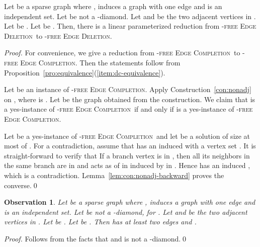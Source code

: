 \documentclass[envcountsame,envcountsect,10pt,oribibl]{llncs}
\newcommand{\pname}[1]{\textnormal{\textsc{#1}}}
\newcommand{\HED}{\pname{-free Edge Deletion}}
\newcommand{\HDED}{\pname{-free Edge Deletion}}
\newcommand{\HBEC}{\pname{-free Edge Completion}}
\newcommand{\HDBEC}{\pname{-free Edge Completion}}
\newtheorem{observation}[lemma]{Observation}
\begin{document}
\begin{lemma}
  \label{lem:vh1vl0}
  Let  be a sparse  graph where , 
  induces a graph with one edge and  is an independent set.
  Let  be not a -diamond.
  Let  and  be the two adjacent vertices in .
  Let  be . Let  be . 
  Then, there is a linear
  parameterized reduction from \HDED\ to \HED.
\end{lemma}
\begin{proof}
  For convenience, we give a reduction from \HDBEC\ to \HBEC. Then the statements follow 
  from Proposition~\ref{pro:equivalence}(\ref{item:dc-equivalence}).

  Let  be an instance of \HDBEC. Apply Construction~\ref{con:nonadj}
  on , where  is .
  Let  be the graph obtained from the construction. We claim that 
   is a yes-instance of \HDBEC\ if and only if  is a 
  yes-instance of \HBEC.

  Let  be a yes-instance of \HDBEC\ and let  be a solution of size
  at most  of . For a contradiction, assume that  has an induced
   with a vertex set . It is straight-forward to verify that 
  If a branch vertex  is in , then all its neighbors in the same branch are in  and
   acts as  of  in 
  induced by  in . Hence  has an induced , which is a contradiction.
  Lemma~\ref{lem:con:nonadj-backward} proves the converse.\qed  
\end{proof}

\begin{observation}
  \label{obs:vh1vl0}
  Let  be a sparse  graph where , 
  induces a graph with one edge and  is an independent set.
  Let  be not a -diamond, for .
  Let  and  be the two adjacent vertices in .
  Let  be . Let  be . 
  Then  has at least two edges and .
\end{observation}
\begin{proof}
  Follows from the facts that  and  is not a -diamond.\qed
\end{proof}
\end{document}
